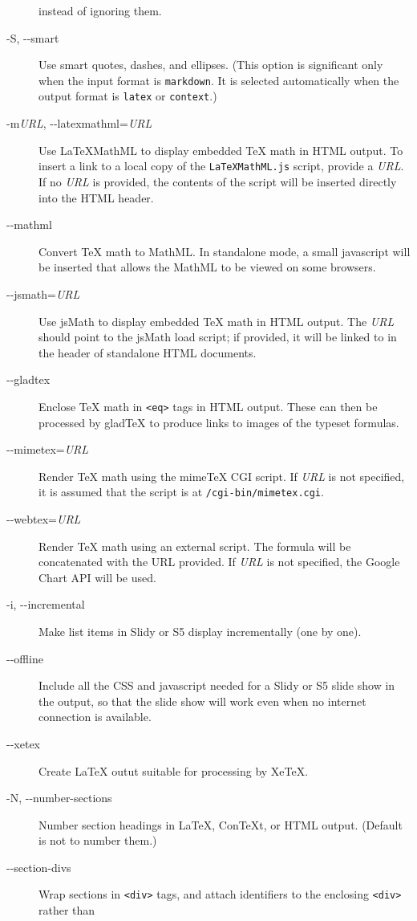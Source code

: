 \documentclass[
  12pt,
  a4paper,
]{article}
\begin{document}
\begin{description}
instead of ignoring them.
\item[-S, -\/-smart]
Use smart quotes, dashes, and ellipses. (This option is significant only when
the input format is \texttt{markdown}. It is selected automatically when the
output format is \texttt{latex} or \texttt{context}.)
\item[-m\emph{URL}, -\/-latexmathml=\emph{URL}]
Use LaTeXMathML to display embedded TeX math in HTML output. To insert a link
to a local copy of the \texttt{LaTeXMathML.js} script, provide a \emph{URL}.
If no \emph{URL} is provided, the contents of the script will be inserted
directly into the HTML header.
\item[-\/-mathml]
Convert TeX math to MathML. In standalone mode, a small javascript will be
inserted that allows the MathML to be viewed on some browsers.
\item[-\/-jsmath=\emph{URL}]
Use jsMath to display embedded TeX math in HTML output. The \emph{URL} should
point to the jsMath load script; if provided, it will be linked to in the
header of standalone HTML documents.
\item[-\/-gladtex]
Enclose TeX math in \texttt{\textless{}eq\textgreater{}} tags in HTML output.
These can then be processed by gladTeX to produce links to images of the
typeset formulas.
\item[-\/-mimetex=\emph{URL}]
Render TeX math using the mimeTeX CGI script. If \emph{URL} is not specified,
it is assumed that the script is at \texttt{/cgi-bin/mimetex.cgi}.
\item[-\/-webtex=\emph{URL}]
Render TeX math using an external script. The formula will be concatenated
with the URL provided. If \emph{URL} is not specified, the Google Chart API
will be used.
\item[-i, -\/-incremental]
Make list items in Slidy or S5 display incrementally (one by one).
\item[-\/-offline]
Include all the CSS and javascript needed for a Slidy or S5 slide show in the
output, so that the slide show will work even when no internet connection is
available.
\item[-\/-xetex]
Create LaTeX outut suitable for processing by XeTeX.
\item[-N, -\/-number-sections]
Number section headings in LaTeX, ConTeXt, or HTML output. (Default is not to
number them.)
\item[-\/-section-divs]
Wrap sections in \texttt{\textless{}div\textgreater{}} tags, and attach
identifiers to the enclosing \texttt{\textless{}div\textgreater{}} rather than

\end{description}
\end{document}

